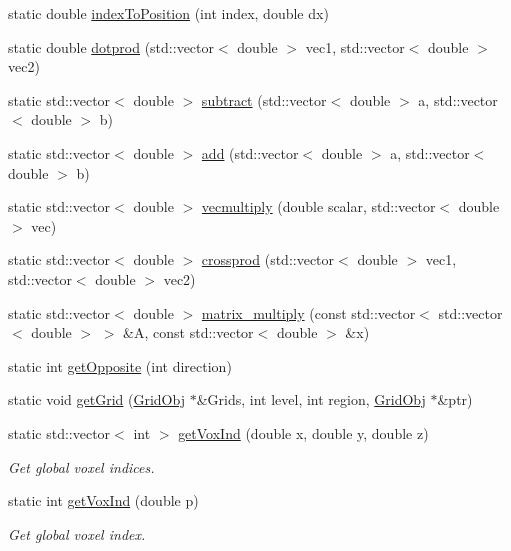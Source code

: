 \begin{DoxyCompactItemize}
\item 
static double \hyperlink{class_grid_utils_a47d5c12d681b275441029744febbb520}{index\+To\+Position} (int index, double dx)
\item 
static double \hyperlink{class_grid_utils_af374256beaf42d97b23f7d98af93a3f1}{dotprod} (std\+::vector$<$ double $>$ vec1, std\+::vector$<$ double $>$ vec2)
\item 
static std\+::vector$<$ double $>$ \hyperlink{class_grid_utils_a6f5af65d6bb25e0d34be50670b41514f}{subtract} (std\+::vector$<$ double $>$ a, std\+::vector$<$ double $>$ b)
\item 
static std\+::vector$<$ double $>$ \hyperlink{class_grid_utils_a4e9fc081a19660e9db39428014c04a9c}{add} (std\+::vector$<$ double $>$ a, std\+::vector$<$ double $>$ b)
\item 
static std\+::vector$<$ double $>$ \hyperlink{class_grid_utils_a01eba1d90d3414637d5031850ad89ce3}{vecmultiply} (double scalar, std\+::vector$<$ double $>$ vec)
\item 
static std\+::vector$<$ double $>$ \hyperlink{class_grid_utils_aeb315c03a681483339de9f60ab2964d6}{crossprod} (std\+::vector$<$ double $>$ vec1, std\+::vector$<$ double $>$ vec2)
\item 
static std\+::vector$<$ double $>$ \hyperlink{class_grid_utils_a0051918813c63802d79bd7d172e8ad8a}{matrix\+\_\+multiply} (const std\+::vector$<$ std\+::vector$<$ double $>$ $>$ \&A, const std\+::vector$<$ double $>$ \&x)
\item 
static int \hyperlink{class_grid_utils_af3c54e468658879756c71b01abd028d5}{get\+Opposite} (int direction)
\item 
static void \hyperlink{class_grid_utils_afac10170d3f6f96a32da6a783b815954}{get\+Grid} (\hyperlink{class_grid_obj}{Grid\+Obj} $\ast$\&Grids, int level, int region, \hyperlink{class_grid_obj}{Grid\+Obj} $\ast$\&ptr)
\item 
static std\+::vector$<$ int $>$ \hyperlink{class_grid_utils_a46ee98a0b0967c88230aee8d19497914}{get\+Vox\+Ind} (double x, double y, double z)
\begin{DoxyCompactList}\small\item\em Get global voxel indices. \end{DoxyCompactList}\item 
static int \hyperlink{class_grid_utils_a056e6dc8478f608bc2ab374eee6e8c24}{get\+Vox\+Ind} (double p)
\begin{DoxyCompactList}\small\item\em Get global voxel index. \end{DoxyCompactList}\item 

\end{DoxyCompactItemize}

